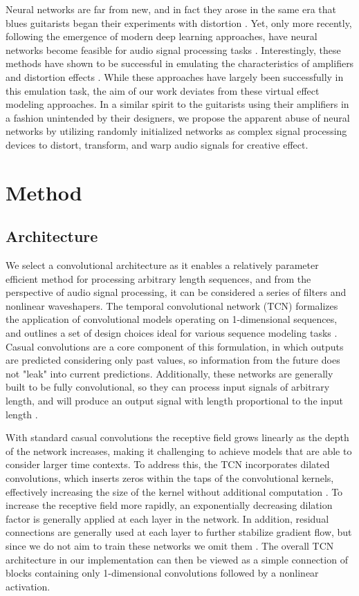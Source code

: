 \documentclass{article}
\begin{document}
Neural networks are far from new, and in fact they arose in the same era that blues guitarists began their experiments with distortion \cite{schmidhuber2015deep}.
Yet, only more recently, following the emergence of modern deep learning approaches, 
have neural networks become feasible for audio signal processing tasks \cite{purwins2019deep}.
Interestingly, these methods have shown to be successful in emulating the characteristics of amplifiers and distortion effects 
\cite{schmitz2018nonlinear, zhang2018lstm, damskagg2019distortion, martinez2019nonlinear}.
While these approaches have largely been successfully in this emulation task, the aim of our work deviates from these virtual effect modeling approaches.
In a similar spirit to the guitarists using their amplifiers in a fashion unintended by their designers,
we propose the apparent abuse of neural networks by utilizing randomly initialized networks as complex signal processing devices
to distort, transform, and warp audio signals for creative effect. 

\section{Method}
\subsection{Architecture}

We select a convolutional architecture as it enables a relatively parameter efficient method for processing arbitrary length sequences, 
and from the perspective of audio signal processing, it can be considered a series of filters and nonlinear waveshapers.
The temporal convolutional network (TCN) formalizes the application of convolutional models operating on 1-dimensional sequences,
and outlines a set of design choices ideal for various sequence modeling tasks \cite{bai2018tcn}. 
Casual convolutions are a core component of this formulation, in which outputs are predicted considering only past values,
so information from the future does not "leak" into current predictions. 
Additionally, these networks are generally built to be fully convolutional, 
so they can process input signals of arbitrary length, and will produce an output signal with length proportional to the input length \cite{long2015fcn}.

With standard casual convolutions the receptive field grows linearly as the depth of the network increases, 
making it challenging to achieve models that are able to consider larger time contexts. 
To address this, the TCN incorporates dilated convolutions, which inserts zeros within the taps of the convolutional kernels, 
effectively increasing the size of the kernel without additional computation \cite{oord2016wavenet}. 
To increase the receptive field more rapidly, an exponentially decreasing dilation factor is generally applied at each layer in the network. 
In addition, residual connections are generally used at each layer to further stabilize gradient flow, 
but since we do not aim to train these networks we omit them \cite{he2016deep}.
The overall TCN architecture in our implementation can then be viewed as a simple connection of blocks containing
only 1-dimensional convolutions followed by a nonlinear activation. 
\end{document}
